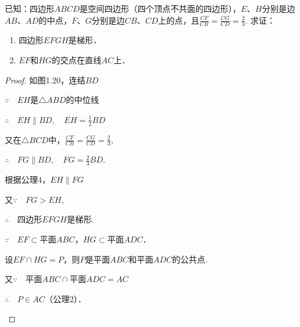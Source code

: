 \begin{example}
    已知：四边形$ABCD$是空间四边形（四个顶点不共面的四边形），$E$、$H$分别是边$AB$、$AD$的中点，$F$、$G$分别是边$CB$、$CD$上的点，且$\frac{CF}{CB}=\frac{CG}{CD}=\frac{2}{3}$. 
    求证：\begin{enumerate}[(1)]
        \item 四边形$EFGH$是梯形．
        \item $EF$和$HG$的交点在直线$AC$上．
    \end{enumerate}
\end{example}

\begin{proof}
如图1.20，连结$BD$

\begin{enumerate}[(1)]
\noindent
\begin{minipage}{.6\textwidth}\CTEXindent

    \item $\because\quad EH$是$\triangle ABD$的中位线

$\therefore\quad EH\parallel BD,\quad EH=\frac{1}{2}BD$

又在$\triangle BCD$中，$\frac{CF}{CB}=\frac{CG}{CD}=\frac{2}{3}$,

$\therefore\quad FG\parallel BD,\quad FG=\frac{2}{3}BD$.

根据公理4，$EH\parallel FG$

又$\because\quad FG>EH$,

$\therefore\quad $四边形$EFGH$是梯形.
\end{minipage}
\hfill
\begin{minipage}{.38\textwidth}
\centering
{}
\end{minipage}

\item $\because\quad EF\subset $平面$ABC$，$HG\subset$平面$ADC$．

设$EF\cap HG=P$，则$P$是平面$ABC$和平面$ADC$的公共点.

又$\because\quad $平面$ABC\cap $平面$ADC=AC$

$\therefore\quad P\in AC$（公理2）．
\end{enumerate}
\end{proof}

